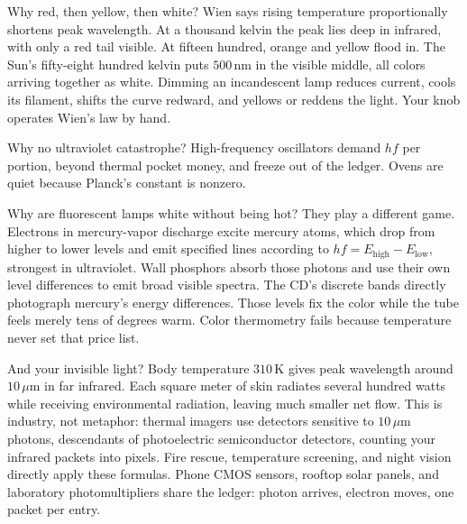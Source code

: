 Why red, then yellow, then white? Wien says rising temperature proportionally shortens peak wavelength. At a thousand kelvin the peak lies deep in infrared, with only a red tail visible. At fifteen hundred, orange and yellow flood in. The Sun's fifty-eight hundred kelvin puts \(500\,\mathrm{nm}\) in the visible middle, all colors arriving together as white. Dimming an incandescent lamp reduces current, cools its filament, shifts the curve redward, and yellows or reddens the light. Your knob operates Wien's law by hand.

Why no ultraviolet catastrophe? High-frequency oscillators demand \(hf\) per portion, beyond thermal pocket money, and freeze out of the ledger. Ovens are quiet because Planck's constant is nonzero.

Why are fluorescent lamps white without being hot? They play a different game. Electrons in mercury-vapor discharge excite mercury atoms, which drop from higher to lower levels and emit specified lines according to \(hf = E_{\text{high}} - E_{\text{low}}\), strongest in ultraviolet. Wall phosphors absorb those photons and use their own level differences to emit broad visible spectra. The CD's discrete bands directly photograph mercury's energy differences. Those levels fix the color while the tube feels merely tens of degrees warm. Color thermometry fails because temperature never set that price list.

And your invisible light? Body temperature \(310\,\mathrm{K}\) gives peak wavelength around \(10\,\mu\mathrm{m}\) in far infrared. Each square meter of skin radiates several hundred watts while receiving environmental radiation, leaving much smaller net flow. This is industry, not metaphor: thermal imagers use detectors sensitive to \(10\,\mu\mathrm{m}\) photons, descendants of photoelectric semiconductor detectors, counting your infrared packets into pixels. Fire rescue, temperature screening, and night vision directly apply these formulas. Phone CMOS sensors, rooftop solar panels, and laboratory photomultipliers share the ledger: photon arrives, electron moves, one packet per entry.


